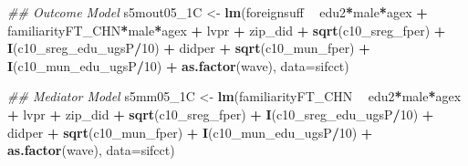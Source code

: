 \documentclass[
]{article}
\newenvironment{Shaded}{\begin{snugshade}}{\end{snugshade}}
\newcommand{\CommentTok}[1]{\textcolor[rgb]{0.56,0.35,0.01}{\textit{#1}}}
\newcommand{\DataTypeTok}[1]{\textcolor[rgb]{0.13,0.29,0.53}{#1}}
\newcommand{\DecValTok}[1]{\textcolor[rgb]{0.00,0.00,0.81}{#1}}
\newcommand{\KeywordTok}[1]{\textcolor[rgb]{0.13,0.29,0.53}{\textbf{#1}}}
\newcommand{\NormalTok}[1]{#1}
\newcommand{\OperatorTok}[1]{\textcolor[rgb]{0.81,0.36,0.00}{\textbf{#1}}}
\newcommand{\StringTok}[1]{\textcolor[rgb]{0.31,0.60,0.02}{#1}}
\begin{document}
\begin{Shaded}
\begin{Highlighting}[]
\CommentTok{## Outcome Model }
\NormalTok{s5mout05_1C <-}\StringTok{ }\KeywordTok{lm}\NormalTok{(foreignsuff  }\OperatorTok{~}\StringTok{ }\NormalTok{edu2}\OperatorTok{*}\NormalTok{male}\OperatorTok{*}\NormalTok{agex }\OperatorTok{+}\StringTok{ }\NormalTok{familiarityFT_CHN}\OperatorTok{*}\NormalTok{male}\OperatorTok{*}\NormalTok{agex }\OperatorTok{+}\StringTok{ }\NormalTok{lvpr }\OperatorTok{+}\StringTok{  }
\StringTok{                    }\NormalTok{zip_did }\OperatorTok{+}\StringTok{ }\KeywordTok{sqrt}\NormalTok{(c10_sreg_fper) }\OperatorTok{+}\StringTok{ }\KeywordTok{I}\NormalTok{(c10_sreg_edu_ugsP}\OperatorTok{/}\DecValTok{10}\NormalTok{) }\OperatorTok{+}\StringTok{ }
\StringTok{                    }\NormalTok{didper }\OperatorTok{+}\StringTok{ }\KeywordTok{sqrt}\NormalTok{(c10_mun_fper) }\OperatorTok{+}\StringTok{ }\KeywordTok{I}\NormalTok{(c10_mun_edu_ugsP}\OperatorTok{/}\DecValTok{10}\NormalTok{) }\OperatorTok{+}\StringTok{ }
\StringTok{                    }\KeywordTok{as.factor}\NormalTok{(wave), }\DataTypeTok{data=}\NormalTok{sifcct)}

\CommentTok{## Mediator Model}
\NormalTok{s5mm05_1C <-}\StringTok{ }\KeywordTok{lm}\NormalTok{(familiarityFT_CHN  }\OperatorTok{~}\StringTok{ }\NormalTok{edu2}\OperatorTok{*}\NormalTok{male}\OperatorTok{*}\NormalTok{agex }\OperatorTok{+}\StringTok{ }\NormalTok{lvpr }\OperatorTok{+}\StringTok{  }
\StringTok{                  }\NormalTok{zip_did }\OperatorTok{+}\StringTok{ }\KeywordTok{sqrt}\NormalTok{(c10_sreg_fper) }\OperatorTok{+}\StringTok{ }\KeywordTok{I}\NormalTok{(c10_sreg_edu_ugsP}\OperatorTok{/}\DecValTok{10}\NormalTok{) }\OperatorTok{+}\StringTok{ }
\StringTok{                  }\NormalTok{didper }\OperatorTok{+}\StringTok{ }\KeywordTok{sqrt}\NormalTok{(c10_mun_fper) }\OperatorTok{+}\StringTok{ }\KeywordTok{I}\NormalTok{(c10_mun_edu_ugsP}\OperatorTok{/}\DecValTok{10}\NormalTok{) }\OperatorTok{+}\StringTok{ }
\StringTok{                  }\KeywordTok{as.factor}\NormalTok{(wave), }\DataTypeTok{data=}\NormalTok{sifcct)}


\end{Highlighting}
\end{Shaded}
\end{document}

